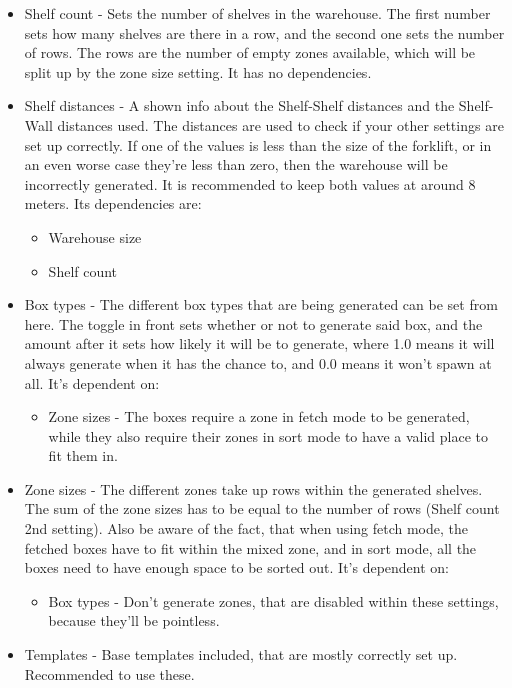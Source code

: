 \documentclass{article}
\begin{document}
\begin{itemize}
    \item Shelf count - Sets the number of shelves in the warehouse. The first number sets how many
    shelves are there in a row, and the second one sets the number of rows. The rows are 
    the number of empty zones available, which will be split up by the zone size setting. It has no
    dependencies.
    \item Shelf distances - A shown info about the Shelf-Shelf distances and the Shelf-Wall distances
    used. The distances are used to check if your other settings are set up correctly.
    If one of the values is less than the size of the forklift, or in an even worse case they're 
    less than zero, then the warehouse will be incorrectly generated. It is recommended to keep both
    values at around 8 meters. Its dependencies are:
    \begin{itemize}
        \item Warehouse size
        \item Shelf count
    \end{itemize}
    \item Box types - The different box types that are being generated can be set from here. The toggle
    in front sets whether or not to generate said box, and the amount after it sets how likely it will be
    to generate, where 1.0 means it will always generate when it has the chance to, and 0.0 means it won't
    spawn at all. It's dependent on:
    \begin{itemize}
        \item Zone sizes - The boxes require a zone in fetch mode to be generated, while they also require
        their zones in sort mode to have a valid place to fit them in.
    \end{itemize}
    \item Zone sizes - The different zones take up rows within the generated shelves. The sum of the zone
    sizes has to be equal to the number of rows (Shelf count 2nd setting). Also be aware of the fact, that
    when using fetch mode, the fetched boxes have to fit within the mixed zone, and in sort mode, all the
    boxes need to have enough space to be sorted out. It's dependent on:
    \begin{itemize}
        \item Box types - Don't generate zones, that are disabled within these settings, because they'll be
        pointless.
    \end{itemize}
    \item Templates - Base templates included, that are mostly correctly set up. Recommended to use these.
\end{itemize}
\end{document}

